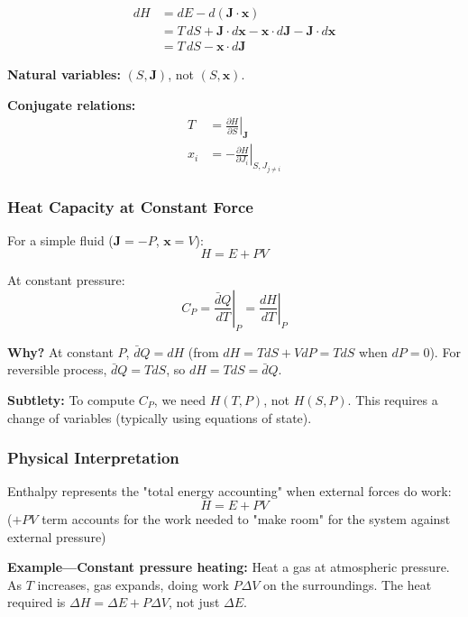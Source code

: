 \documentclass[9pt,twocoloumn]{article}
\begin{document}
\begin{align}
dH &= dE - d(\mathbf{J} \cdot \mathbf{x}) \\
&= T \, dS + \mathbf{J} \cdot d\mathbf{x} - \mathbf{x} \cdot d\mathbf{J} - \mathbf{J} \cdot d\mathbf{x} \\
&= T \, dS - \mathbf{x} \cdot d\mathbf{J}
\end{align}

\textbf{Natural variables:} $(S, \mathbf{J})$, not $(S, \mathbf{x})$.

\textbf{Conjugate relations:}
\begin{align}
T &= \left. \frac{\partial H}{\partial S} \right|_{\mathbf{J}} \\
x_i &= -\left. \frac{\partial H}{\partial J_i} \right|_{S, J_{j \neq i}}
\end{align}

\subsubsection{Heat Capacity at Constant Force}

For a simple fluid ($\mathbf{J} = -P$, $\mathbf{x} = V$):
\begin{equation}
H = E + PV
\end{equation}

At constant pressure:
\begin{equation}
C_P = \left. \frac{\bar{d}Q}{dT} \right|_P = \left. \frac{dH}{dT} \right|_P
\end{equation}

\textbf{Why?} At constant $P$, $\bar{d}Q = dH$ (from $dH = T dS + V dP = T dS$ when $dP = 0$). For reversible process, $\bar{d}Q = T dS$, so $dH = T dS = \bar{d}Q$.

\textbf{Subtlety:} To compute $C_P$, we need $H(T, P)$, not $H(S, P)$. This requires a change of variables (typically using equations of state).

\subsubsection{Physical Interpretation}

Enthalpy represents the "total energy accounting" when external forces do work:
\begin{equation}
H = E + P V
\end{equation}
($+PV$ term accounts for the work needed to "make room" for the system against external pressure)

\textbf{Example—Constant pressure heating:} Heat a gas at atmospheric pressure. As $T$ increases, gas expands, doing work $P \Delta V$ on the surroundings. The heat required is $\Delta H = \Delta E + P \Delta V$, not just $\Delta E$.
\end{document}
